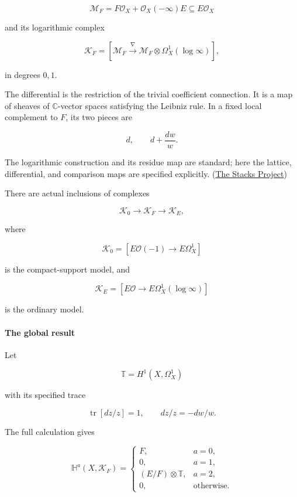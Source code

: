 \[
\mathcal M_F
=
F\mathcal O_X+\mathcal O_X(-\infty)E
\subseteq E\mathcal O_X
\]

and its logarithmic complex

\[
\boxed{
\mathcal K_F=
\left[
\mathcal M_F
\xrightarrow{\nabla}
\mathcal M_F\otimes\Omega_X^1(\log\infty)
\right],
}
\]

in degrees \(0,1\).

The differential is the restriction of the trivial coefficient connection. It is a map of sheaves of \(\mathbb C\)-vector spaces satisfying the Leibniz rule. In a fixed local complement to \(F\), its two pieces are

\[
d,\qquad d+\frac{dw}{w}.
\]

The logarithmic construction and its residue map are standard; here the lattice, differential, and comparison maps are specified explicitly. (\href{https://stacks.math.columbia.edu/tag/0FMU}{The Stacks Project})

There are actual inclusions of complexes

\[
\boxed{
\mathcal K_0\longrightarrow\mathcal K_F\longrightarrow\mathcal K_E,
}
\]

where

\[
\mathcal K_0=
[E\mathcal O(-1)\longrightarrow E\Omega_X^1]
\]

is the compact-support model, and

\[
\mathcal K_E=
[E\mathcal O\longrightarrow E\Omega_X^1(\log\infty)]
\]

is the ordinary model.

\paragraph{The global result}\label{endpoint-exponential_constituent_original--the-global-result}

Let

\[
\mathbb T=H^1(X,\Omega_X^1)
\]

with its specified trace

\[
\operatorname{tr}[dz/z]=1,\qquad dz/z=-dw/w.
\]

The full calculation gives

\[
\boxed{
\mathbb H^a(X,\mathcal K_F)=
\begin{cases}
F,&a=0,\\
0,&a=1,\\
(E/F)\otimes\mathbb T,&a=2,\\
0,&\text{otherwise}.
\end{cases}
}
\]

